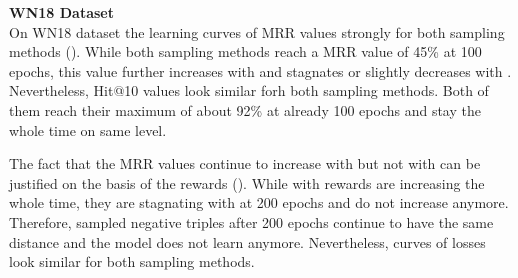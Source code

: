 \textbf{WN18 Dataset}
\label{subsubsec:uncertainty_wn18}\\
%
On \textsc{WN18} dataset the learning curves of MRR values strongly for both sampling methods ().
While both sampling methods reach a MRR value of 45\% at 100 epochs, this value further increases with \origsampling and stagnates or slightly decreases with \ussoftmax.
Nevertheless, Hit@10 values look similar forh both sampling methods.
Both of them reach their maximum of about 92\% at already 100 epochs and stay the whole time on same level.

The fact that the MRR values continue to increase with \origsampling but not with \ussoftmax can be justified on the basis of the rewards ().
While with \origsampling rewards are increasing the whole time, they are stagnating with \ussoftmax at 200 epochs and do not increase anymore.
Therefore, sampled negative triples after 200 epochs continue to have the same distance and the model does not learn anymore.
Nevertheless, curves of losses look similar for both sampling methods.
\clearpage
